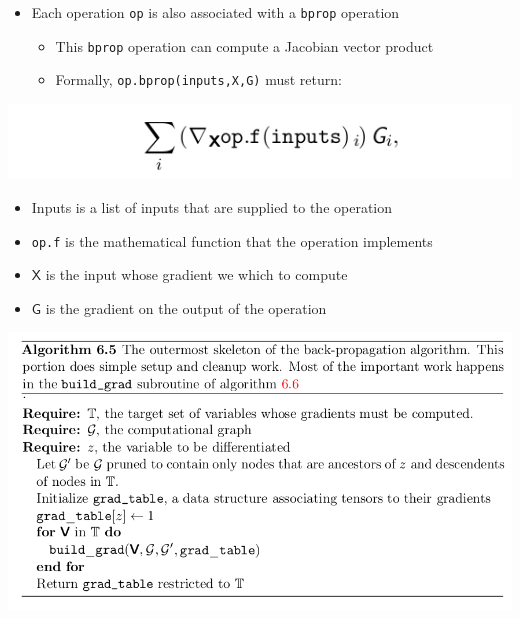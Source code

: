 \documentclass[11pt]{article}
\begin{document}
\begin{itemize}
\item Each operation \texttt{op} is also associated with a \texttt{bprop} operation
\begin{itemize}
\item This \texttt{bprop} operation can compute a Jacobian vector product
\item Formally, \texttt{op.bprop(inputs,X,G)} must return:
\end{itemize}
\end{itemize}
\begin{center}
\includegraphics[width=.9\linewidth]{Deep Feedforward Networks/screenshot_2018-10-02_08-58-55.png}
\end{center}
\begin{itemize}
\item Inputs is a list of inputs that are supplied to the operation
\item \texttt{op.f} is the mathematical function that the operation implements
\item \(\mathbf{\mathsf X}\) is the input whose gradient we which to compute
\item \(\mathbf{\mathsf G}\) is the gradient on the output of the operation
\end{itemize}

\begin{center}
\includegraphics[width=.9\linewidth]{Deep Feedforward Networks/screenshot_2018-10-02_09-04-05.png}
\end{center}
\end{document}
